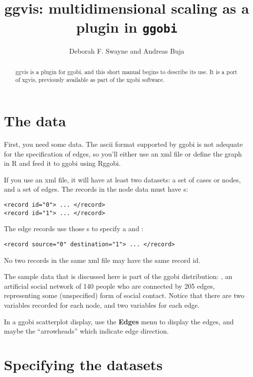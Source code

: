 \documentclass[11pt]{article}
\begin{document}
\title{ggvis: multidimensional scaling as a plugin in {\tt ggobi}}
\author{Deborah F. Swayne and Andreas Buja}
\maketitle

\begin{abstract}
ggvis is a plugin for ggobi, and this short manual begins
to describe its use.  It is a port of xgvis,  previously
available as part of the xgobi software.
\end{abstract}

\section{The data}

First, you need some data.  The ascii format supported by ggobi is not
adequate for the specification of edges, so you'll either use an xml file
or define the graph in R and feed it to ggobi using Rggobi.

If you use an xml file, it will have at least two datasets: a set of
cases or nodes, and a set of edges.  The records in the node data must
have s:

\begin{verbatim}
<record id="0"> ... </record>
<record id="1"> ... </record>
\end{verbatim}

The edge records use those s to specify a
 and :

\begin{verbatim}
<record source="0" destination="1"> ... </record>
\end{verbatim}

No two records in the same xml file may have the same record id.

The sample data that is discussed here is part of the ggobi distribution:
, an artificial social network of 140 people who are
connected by 205 edges, representing some (unspecified) form of social
contact.  Notice that there are two variables recorded for each node,
and two variables for each edge.

In a ggobi scatterplot display, use the {\bf Edges} menu to
display the edges, and maybe the ``arrowheads'' which indicate
edge direction.

\section{Specifying the datasets}
\end{document}
